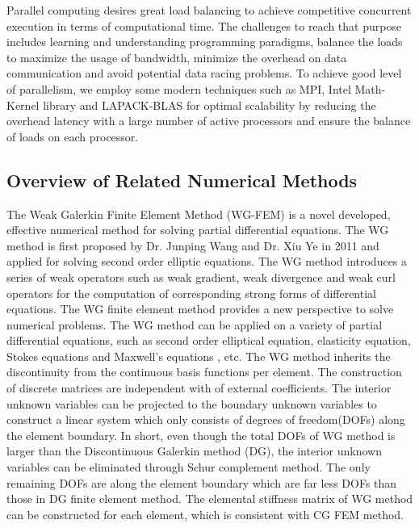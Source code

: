 Parallel computing desires great load balancing to achieve competitive concurrent execution in terms of computational time. The challenges to reach that purpose includes learning and understanding programming paradigms,  balance the loads to maximize the usage of bandwidth, minimize the overhead on data communication and avoid potential data racing problems. To achieve good level of parallelism, we employ some modern techniques such as MPI, Intel Math-Kernel library and LAPACK-BLAS for optimal scalability by reducing the overhead latency with a large number of active processors and ensure the balance of loads on each processor.

\subsection{Overview of Related Numerical Methods}

The Weak Galerkin Finite Element Method (WG-FEM) is a novel developed, effective numerical method for solving partial differential equations. The WG method is first proposed by Dr. Junping Wang and Dr. Xiu Ye in 2011 and applied for solving second order elliptic equations\cite{wang2014weak}. The WG method introduces a series of weak operators such as weak gradient, weak divergence and weak curl operators for the computation of corresponding strong forms of differential equations. The WG finite element method provides a  new perspective to solve numerical problems. The WG method can be applied on a variety of partial differential equations, such as second order elliptical equation, elasticity equation\cite{wang2016locking}, Stokes equations \cite{wang2016weak} and Maxwell's equations \cite{mu2013weak}, etc. The WG method inherits the discontinuity from the continuous basis functions per element. The construction of discrete matrices are independent with of external coefficients. The interior unknown variables can be projected to the boundary unknown variables to construct a linear system which only consists of degrees of freedom(DOFs) along the element boundary. In short, even though the total DOFs of WG method is larger than the Discontinuous Galerkin method (DG), the interior unknown variables can be eliminated through Schur complement method. The only remaining DOFs are along the element boundary which are far less DOFs than those in DG finite element method. The elemental stiffness matrix of WG method can be constructed for each element, which is consistent with CG FEM method. 

